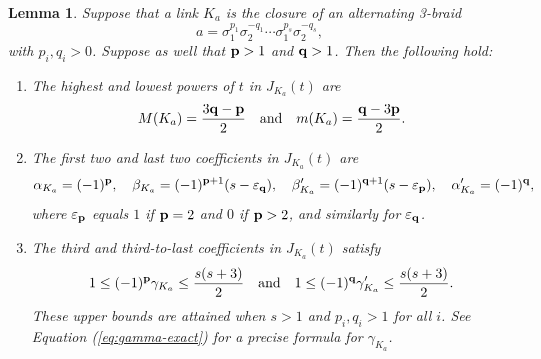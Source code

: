 \documentclass[11pt]{amsart}
\newcommand{\p}{{\bf p}}
\newcommand{\q}{{\bf q}}
\newcommand{\ep}{\varepsilon_{\p}}
\newcommand{\eq}{\varepsilon_{\q}}
\theoremstyle{plain}
\newtheorem{lemma}[theorem]{Lemma}
\theoremstyle{definition}
\begin{document}
\begin{lemma}\label{lemma:alternating}
Suppose that a link $K_a$ is the closure of an alternating 3-braid
$$a= \sigma_1^{p_1} \sigma_2^{-q_1} \cdots \sigma_1^{p_s}
\sigma_2^{-q_s},$$
%
with $p_i, q_i>0$.  Suppose as well that $\p > 1$ and $\q > 1$.
Then the following hold:
\begin{enumerate}
  \item[(a)] The highest and lowest powers of $t$ in $J_{K_a}(t)$ are
$$M(K_a)=\frac{3\q-\p}{2} \quad \mbox{and} \quad
		m(K_a)= \frac{\q-3\p}{2}.$$
  \item[(b)] The first two and last two coefficients in $J_{K_a}(t)$
  are
$$\alpha_{K_a} = (-1)^{\p}, \quad \beta_{K_a} = (-1)^{\p+1} (s - \eq), \quad 
\beta'_{K_a} = (-1)^{\q+1}  (s - \ep), \quad \alpha'_{K_a} =(-1)^{\q},$$
where $\ep$ equals $1$ if $\p = 2$ and $0$ if $\p > 2$, and similarly for $\eq$.
\smallskip

  \item[(c)] The third and third-to-last coefficients in $J_{K_a}(t)$ satisfy
$$1 \leq (-1)^{\p} \gamma_{K_a} \leq \frac{s(s+3)}{2} \quad \mbox{and} \quad
1 \leq (-1)^{\q} \gamma'_{K_a} \leq \frac{s(s+3)}{2}.$$
These upper bounds are attained when $s>1$ and $p_i, q_i > 1$ for all $i$. See Equation (\ref{eq:gamma-exact})
for a precise formula for $\gamma_{K_a}$.
\end{enumerate}
\end{lemma}
\end{document}
